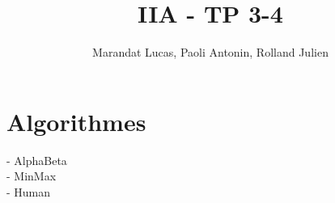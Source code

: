 \documentclass{article}
\title{IIA - TP 3-4}
\author{Marandat Lucas, Paoli Antonin, Rolland Julien}
\begin{document}
    \maketitle
    \tableofcontents

    \section{Algorithmes}
    - AlphaBeta \\
    - MinMax \\
    - Human \\
\end{document}
